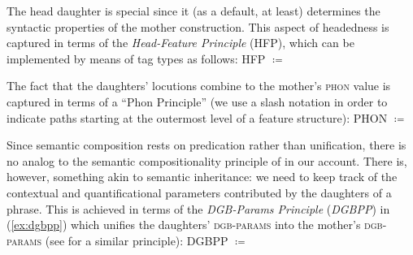 \documentclass[output=paper
 	        ,biblatex
                ,babelshorthands
                ,newtxmath
                ,draftmode
                ,colorlinks, citecolor=brown
]{langscibook}
\begin{document}
The head daughter is special since it (as a default, at least) determines the syntactic properties of the mother construction. 
%
This aspect of headedness is captured in terms of the \emph{Head-Feature Principle} (HFP), which can be implemented by means of tag types as follows:
%
\ea \label{ex:HFP}
HFP $\coloneqq$
\z

The fact that the daughters' locutions combine to the mother's \textsc{phon} value is captured in terms of a \enquote{Phon Principle}  (we use a slash notation in order to indicate paths starting at the outermost level of a feature structure):
%
\ea 
PHON $\coloneqq$ \label{ex:phon-principle}
\z 

Since  semantic composition rests on predication rather than unification, there is no analog to the semantic compositionality principle of \citet{Sag:Wasow:Bender:2003} in our account.
%
There is, however, something akin to semantic inheritance: we need to keep track of the contextual and quantificational parameters contributed by the daughters of a phrase. 
%
This is achieved in terms of the \emph{DGB-Params Principle} (\emph{DGBPP}) in (\ref{ex:dgbpp}) which unifies the daughters' \textsc{dgb-params} into the mother's \textsc{dgb-params}  (see \citealt[126 \textit{et seq.}]{Ginzburg:2012}  for a similar principle): 
%
\ea \label{ex:dgbpp}
DGBPP $\coloneqq$ \label{ex:QPP} \par\medskip
{}
\z
\end{document}
